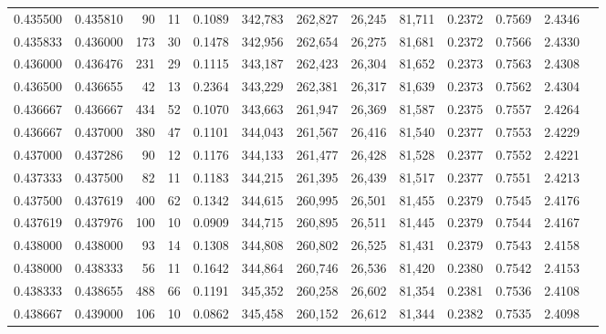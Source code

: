 \begin{tabular}{rrrrrrrrrrrrr}
0.435500 & 0.435810 &    90 &  11 &                                     0.1089 & 342,783 & 262,827 &  26,245 &  81,711 & 0.2372 & 0.7569 & 2.4346 \\
0.435833 & 0.436000 &   173 &  30 &                                     0.1478 & 342,956 & 262,654 &  26,275 &  81,681 & 0.2372 & 0.7566 & 2.4330 \\
0.436000 & 0.436476 &   231 &  29 &                                     0.1115 & 343,187 & 262,423 &  26,304 &  81,652 & 0.2373 & 0.7563 & 2.4308 \\
0.436500 & 0.436655 &    42 &  13 &                                     0.2364 & 343,229 & 262,381 &  26,317 &  81,639 & 0.2373 & 0.7562 & 2.4304 \\
0.436667 & 0.436667 &   434 &  52 &                                     0.1070 & 343,663 & 261,947 &  26,369 &  81,587 & 0.2375 & 0.7557 & 2.4264 \\
0.436667 & 0.437000 &   380 &  47 &                                     0.1101 & 344,043 & 261,567 &  26,416 &  81,540 & 0.2377 & 0.7553 & 2.4229 \\
0.437000 & 0.437286 &    90 &  12 &                                     0.1176 & 344,133 & 261,477 &  26,428 &  81,528 & 0.2377 & 0.7552 & 2.4221 \\
0.437333 & 0.437500 &    82 &  11 &                                     0.1183 & 344,215 & 261,395 &  26,439 &  81,517 & 0.2377 & 0.7551 & 2.4213 \\
0.437500 & 0.437619 &   400 &  62 &                                     0.1342 & 344,615 & 260,995 &  26,501 &  81,455 & 0.2379 & 0.7545 & 2.4176 \\
0.437619 & 0.437976 &   100 &  10 &                                     0.0909 & 344,715 & 260,895 &  26,511 &  81,445 & 0.2379 & 0.7544 & 2.4167 \\
0.438000 & 0.438000 &    93 &  14 &                                     0.1308 & 344,808 & 260,802 &  26,525 &  81,431 & 0.2379 & 0.7543 & 2.4158 \\
0.438000 & 0.438333 &    56 &  11 &                                     0.1642 & 344,864 & 260,746 &  26,536 &  81,420 & 0.2380 & 0.7542 & 2.4153 \\
0.438333 & 0.438655 &   488 &  66 &                                     0.1191 & 345,352 & 260,258 &  26,602 &  81,354 & 0.2381 & 0.7536 & 2.4108 \\
0.438667 & 0.439000 &   106 &  10 &                                     0.0862 & 345,458 & 260,152 &  26,612 &  81,344 & 0.2382 & 0.7535 & 2.4098 \\

\end{tabular}
